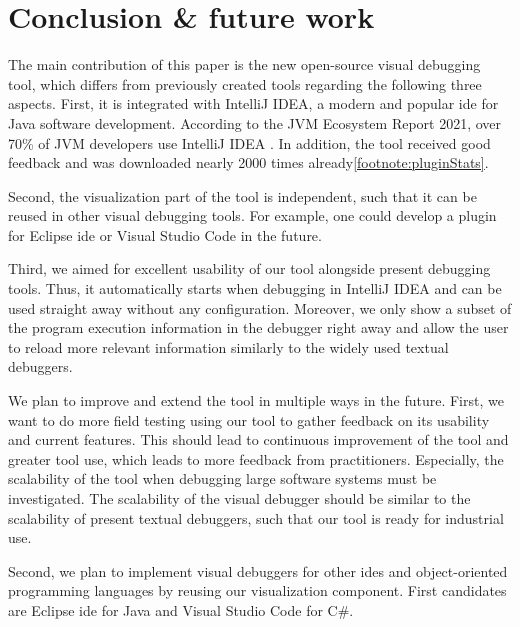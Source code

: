 \documentclass[conference]{IEEEtran}
\newcommand{\intellij}{IntelliJ IDEA}
\begin{document}
\section{Conclusion \& future work} \label{sec:conclusion}
The main contribution of this paper is the new open-source visual debugging tool, which differs from previously created tools regarding the following three aspects.
First, it is integrated with \intellij{}, a modern and popular \gls*{ide} for Java software development.
According to the JVM Ecosystem Report 2021, over 70\% of JVM developers use \intellij{}  \cite{JVMEcosystemReport2021}.
In addition, the tool received good feedback and was downloaded nearly 2000 times already\cref{footnote:pluginStats}.

Second, the visualization part of the tool is independent, such that it can be reused in other visual debugging tools.
For example, one could develop a plugin for Eclipse \gls*{ide} or Visual Studio Code in the future.

Third, we aimed for excellent usability of our tool alongside present debugging tools.
Thus, it automatically starts when debugging in \intellij{} and can be used straight away without any configuration.
Moreover, we only show a subset of the program execution information in the debugger right away and allow the user to reload more relevant information similarly to the widely used textual debuggers.

We plan to improve and extend the tool in multiple ways in the future.
First, we want to do more field testing using our tool to gather feedback on its usability and current features.
This should lead to continuous improvement of the tool and greater tool use, which leads to more feedback from practitioners. 
Especially, the scalability of the tool when debugging large software systems must be investigated.
The scalability of the visual debugger should be similar to the scalability of present textual debuggers, such that our tool is ready for industrial use.

Second, we plan to implement visual debuggers for other \glspl*{ide} and object-oriented programming languages by reusing our visualization component.
First candidates are Eclipse \gls*{ide} for Java and Visual Studio Code for C\#.
\end{document}
